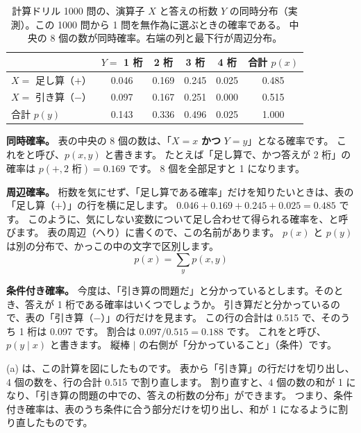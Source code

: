 \begin{table}[tbp]
\centering
\caption{計算ドリル 1000 問の、演算子 $X$ と答えの桁数 $Y$ の同時分布（実測）。この 1000 問から 1 問を無作為に選ぶときの確率である。
中央の 8 個の数が同時確率。右端の列と最下行が周辺分布。}
\label{tab:math-joint}
\small
\begin{tabular}{@{}lccccc@{}}
\toprule
 & $Y=$ 1 桁 & 2 桁 & 3 桁 & 4 桁 & 合計 $p(x)$ \\
\midrule
$X=$ 足し算（$+$） & 0.046 & 0.169 & 0.245 & 0.025 & 0.485 \\
$X=$ 引き算（$-$） & 0.097 & 0.167 & 0.251 & 0.000 & 0.515 \\
\midrule
合計 $p(y)$ & 0.143 & 0.336 & 0.496 & 0.025 & 1.000 \\
\bottomrule
\end{tabular}
\end{table}

\textbf{同時確率。}
表の中央の 8 個の数は、「$X=x$ \textbf{かつ} $Y=y$」となる確率です。
これをと呼び、$p(x,y)$ と書きます。
たとえば「足し算で、かつ答えが 2 桁」の確率は $p(+,\text{2 桁})=0.169$ です。
8 個を全部足すと 1 になります。

\textbf{周辺確率。}
桁数を気にせず、「足し算である確率」だけを知りたいときは、表の「足し算（$+$）」の行を横に足します。
$0.046+0.169+0.245+0.025=0.485$ です。
このように、気にしない変数について足し合わせて得られる確率を、と呼びます。
表の周辺（へり）に書くので、この名前があります。
$p(x)$ と $p(y)$ は別の分布で、かっこの中の文字で区別します。
\begin{equation}
p(x)=\sum_{y}p(x,y)
\label{eq:math-marginal}
\end{equation}

\textbf{条件付き確率。}
今度は、「引き算の問題だ」と分かっているとします。そのとき、答えが 1 桁である確率はいくつでしょうか。
引き算だと分かっているので、表の「引き算（$-$）」の行だけを見ます。
この行の合計は 0.515 で、そのうち 1 桁は 0.097 です。
割合は $0.097/0.515=0.188$ です。
これをと呼び、$p(y\mid x)$ と書きます。
縦棒 $\mid$ の右側が「分かっていること」（条件）です。

(a) は、この計算を図にしたものです。
表から「引き算」の行だけを切り出し、4 個の数を、行の合計 0.515 で割り直します。
割り直すと、4 個の数の和が 1 になり、「引き算の問題の中での、答えの桁数の分布」ができます。
つまり、条件付き確率は、表のうち条件に合う部分だけを切り出し、和が 1 になるように割り直したものです。

